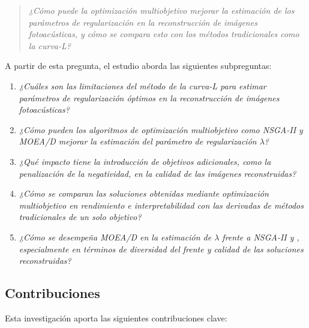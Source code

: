 \begin{quote}
    \textit{¿Cómo puede la optimización multiobjetivo mejorar la estimación de los parámetros de regularización en la reconstrucción de imágenes fotoacústicas, y cómo se compara esto con los métodos tradicionales como la curva-L?}
\end{quote}

A partir de esta pregunta, el estudio aborda las siguientes subpreguntas:

\begin{enumerate}[start=1,label={RQ\arabic*:},wide = 0pt, leftmargin = 3em]
    \item \textit{¿Cuáles son las limitaciones del método de la curva-L para estimar parámetros de regularización óptimos en la reconstrucción de imágenes fotoacústicas?}
    \item \textit{¿Cómo pueden los algoritmos de optimización multiobjetivo como NSGA-II y MOEA/D mejorar la estimación del parámetro de regularización \( \lambda \)?}
    \item \textit{¿Qué impacto tiene la introducción de objetivos adicionales, como la penalización de la negatividad, en la calidad de las imágenes reconstruidas?}
    \item \textit{¿Cómo se comparan las soluciones obtenidas mediante optimización multiobjetivo en rendimiento e interpretabilidad con las derivadas de métodos tradicionales de un solo objetivo?}
    \item \textit{¿Cómo se desempeña MOEA/D en la estimación de \( \lambda \) frente a NSGA-II y , especialmente en términos de diversidad del frente y calidad de las soluciones reconstruidas?}
\end{enumerate}

\subsection{Contribuciones} \label{sec:cont}

Esta investigación aporta las siguientes contribuciones clave:

